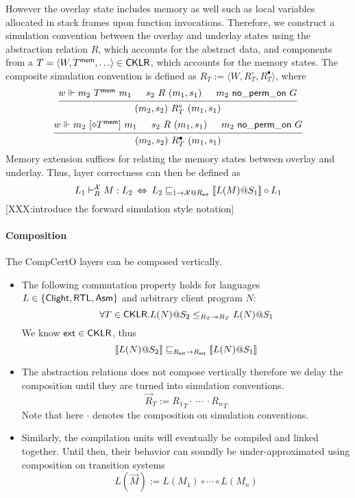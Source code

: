 \documentclass[sigplan,10pt,authordraft]{acmart}
\begin{document}
However the overlay state includes memory as well such as local variables
allocated in stack frames upon function invocations. Therefore, we construct a
simulation convention between the overlay and underlay states using the
abstraction relation $R$, which accounts for the abstract data, and components
from a $T = \langle W, T^{ \mathsf{mem} }, \ldots \rangle \in  \mathsf{CKLR} $, which accounts
for the memory states. The composite simulation convention is defined as
$R_T := \langle W, R_T^\circ, R_T^\bullet \rangle$, where
\[
  \begin{prooftree}
    \hypo{w \Vdash m_2\ T^\kw{mem}\ m_1}
    \hypo{s_2\ R\ (m_1, s_1)}
    \hypo{m_2\ \kw{no\_perm\_on}\ G}
    \infer3{(m_2, s_2)\ R_T^\circ\ (m_1, s_1)}
  \end{prooftree}
\]
\[
  \begin{prooftree}
    \hypo{w \Vdash m_2\ [\diamond T^\kw{mem}]\ m_1}
    \hypo{s_2\ R\ (m_1, s_1)}
    \hypo{m_2\ \kw{no\_perm\_on}\ G}
    \infer3{(m_2, s_2)\ R_T^\bullet\ (m_1, s_1)}
  \end{prooftree}
\]
Memory extension suffices for relating the memory states between overlay and
underlay. Thus, layer correctness can then be defined as
\[
  L_1 \vdash_R^\mathcal{X} M : L_2
  \:\Leftrightarrow\:
  L_2 \sqsubseteq_{1 \rightarrow \mathcal{X}@R_{ \mathsf{ext} }}
  \llbracket L(M) @S_1 \rrbracket 
  \circ L_1
\]
[XXX:introduce the forward simulation style notation]

\paragraph{Composition} The CompCertO layers can be composed vertically.

\begin{itemize}
\item The following commutation property holds for languages
  $L\in \{ \mathsf{Clight} ,  \mathsf{RTL} ,  \mathsf{Asm} \}$ and arbitrary client program $N$:
  \[
    \forall T \in  \mathsf{CKLR} . L(N)@S_2\le_{R_{T}\twoheadrightarrow R_{T}} L(N)@S_1
  \]
  We know $ \mathsf{ext} \in  \mathsf{CKLR} $, thus
  \[
    \llbracket L(N) @S_2 \rrbracket 
    \sqsubseteq_{R_{ \mathsf{ext} }\rightarrow R_{ \mathsf{ext} }}
    \llbracket L(N) @S_1 \rrbracket 
  \]

\item The abstraction relations does not compose vertically therefore we delay
  the composition until they are turned into simulation conventions.
  \[
    \vec{R}_T := {R_1}_T \cdot\ \cdots\ \cdot {R_n}_T
  \]
  Note that here $\cdot$ denotes the composition on simulation conventions.
\item Similarly, the compilation units will eventually be compiled and linked
  together. Until then, their behavior can soundly be under-approximated using
  composition on transition systems
  \[
    L(\vec{M}) := L(M_1) \circ \cdots \circ L(M_n)
  \]
\end{itemize}
\end{document}
